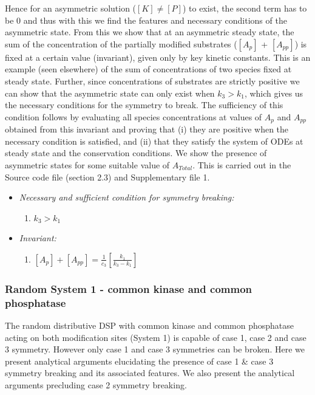 \documentclass[9pt,lineno]{elife}
\begin{document}
\begin{appendixbox}
Hence for an asymmetric solution ($[K] \neq [P]$) to exist, the second term has to be $0$ and thus with this we find the features and necessary conditions of the asymmetric state. From this we show that at an asymmetric steady state, the sum of the concentration of the partially modified substrates ($[A_p]$ + $[A_{pp}]$) is fixed at a certain value (invariant), given only by key kinetic constants.
This is an example (seen elsewhere) of the sum of concentrations of two species fixed at steady state. Further, since concentrations of substrates are strictly positive we can show that the asymmetric state can only exist when $k_3 > k_1$, which gives us the necessary conditions for the symmetry to break. The sufficiency of this condition follows by evaluating all species concentrations at  values of $A_p$ and $A_{pp}$ obtained from this invariant and proving that (i) they are positive when the necessary condition is satisfied, and (ii) that they satisfy the system of ODEs at steady state and the conservation conditions. We show the presence of asymmetric states
for some suitable value of $A_{Total}$. This is carried out in the Source code file (section 2.3) and Supplementary file 1.

\begin{itemize}
    \item \textit{Necessary and sufficient condition for symmetry breaking:}
    \begin{enumerate}
        \item $k_3 > k_1$
    \end{enumerate}
    \item \textit{Invariant:} 
    \begin{enumerate}
        \item $[A_p] + [A_{pp}] = \frac{1}{c_3}\left[\frac{k_1}{k_3-k_1}\right]$
    \end{enumerate}
\end{itemize}

\subsubsection*{Random System 1 - common kinase and common phosphatase}

The random  distributive DSP with common kinase and common phosphatase acting on both modification sites (System 1) is capable of case 1, case 2 and case 3 symmetry. However only case 1 and case 3 symmetries can be broken. Here we present analytical arguments elucidating the presence of case 1 \& case 3 symmetry breaking and its associated features. We also present the analytical arguments precluding case 2 symmetry breaking.


\end{appendixbox}
\end{document}
